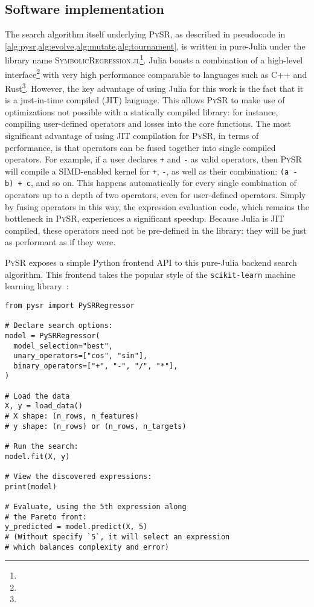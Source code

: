 \documentclass[letterpaper,twocolumn]{scrartcl}
\newcommand\pysr{\textsc{PySR}\xspace}
\newcommand\pysrjl{\textsc{SymbolicRegression.jl}\xspace}
\begin{document}
\subsection{Software implementation}
\label{sec:software}

The search algorithm itself underlying \pysr, as described in pseudocode in \cref{alg:pysr,alg:evolve,alg:mutate,alg:tournament}, is written in pure-Julia under the library name \pysrjl\footnote{}.
Julia boasts a combination of a high-level interface\footnote{} with very high performance comparable to languages such as C++ and Rust\footnote{}.
However, the key advantage of using Julia for this work is the fact that it is a just-in-time compiled (JIT) language.
This allows \pysr to make use of optimizations not possible with a statically compiled library: for instance, compiling user-defined operators and losses into the core functions.
The most significant advantage of using JIT compilation for \pysr, in terms of performance, is that operators can be fused together into single compiled operators.
For example, if a user declares \texttt{+} and \texttt{-} as valid operators, then \pysr will compile a SIMD-enabled kernel for \texttt{+}, \texttt{-}, as well as their combination: \texttt{(a - b) + c}, and so on. This happens automatically for every single combination of operators up to a depth of two operators, even for user-defined operators.
Simply by fusing operators in this way, the expression evaluation code, which remains the bottleneck in \pysr, experiences a significant speedup.
Because Julia is JIT compiled, these operators need not be pre-defined in the library: they will be just as performant as if they were.

\pysr exposes a simple Python frontend API to this pure-Julia
backend search algorithm.
This frontend takes the popular style
of the \texttt{scikit-learn} machine learning library~\cite{pedregosaScikitlearnMachineLearning2011b}:
\begin{minipage}{0.95\linewidth}
\begin{verbatim}
from pysr import PySRRegressor

# Declare search options:
model = PySRRegressor(
  model_selection="best",
  unary_operators=["cos", "sin"],
  binary_operators=["+", "-", "/", "*"],
)

# Load the data
X, y = load_data()
# X shape: (n_rows, n_features)
# y shape: (n_rows) or (n_rows, n_targets)

# Run the search:
model.fit(X, y)

# View the discovered expressions:
print(model)

# Evaluate, using the 5th expression along
# the Pareto front:
y_predicted = model.predict(X, 5)
# (Without specify `5`, it will select an expression
# which balances complexity and error)
\end{verbatim}
\end{minipage}
\end{document}
